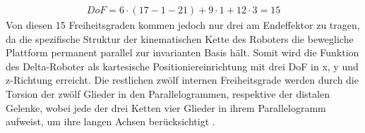 \documentclass[Bachelor, BMR, ngerman]{twbook}
\begin{document}
    \newline
    \begin{align}
        DoF = 6 \cdot (17-1-21) + 9\cdot1 + 12\cdot3 = 15
        \label{eq:grübler}
    \end{align}
    \noindent
    Von diesen 15 Freiheitsgraden kommen jedoch nur drei am Endeffektor zu tragen, da die spezifische Struktur der kinematischen Kette des Roboters die bewegliche Plattform permanent parallel zur invarianten Basis hält. Somit wird die Funktion des Delta-Roboter als kartesische Positioniereinrichtung mit drei DoF in x, y und z-Richtung erreicht. Die restlichen zwölf internen Freiheitsgrade werden durch die Torsion der zwölf Glieder in den Parallelogrammen, respektive der distalen Gelenke, wobei jede der drei Ketten vier Glieder in ihrem Parallelogramm aufweist, um ihre langen Achsen berücksichtigt \cite{LyPa17}.
    
    
    
\end{document}
